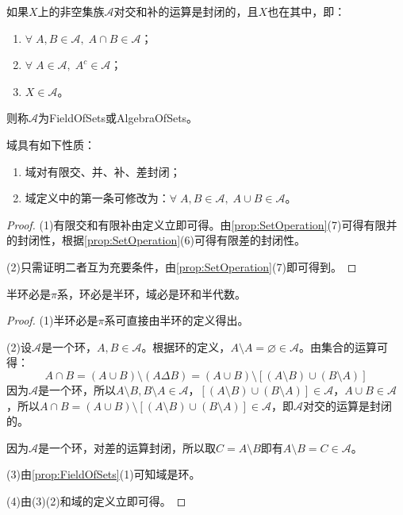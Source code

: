 \begin{definition}
	如果$X$上的非空集族$\mathscr{A}$对交和补的运算是封闭的，且$X$也在其中，即：
	\begin{enumerate}
		\item $\forall\;A,B\in\mathscr{A},\;A\cap B\in\mathscr{A}$；
		\item $\forall\;A\in\mathscr{A},\;A^c\in\mathscr{A}$；
		\item $X\in\mathscr{A}$。
	\end{enumerate}
	则称$\mathscr{A}$为\gls{FieldOfSets}或\gls{AlgebraOfSets}。
\end{definition}
\begin{property}\label{prop:FieldOfSets}
	域具有如下性质：
	\begin{enumerate}
		\item 域对有限交、并、补、差封闭；
		\item 域定义中的第一条可修改为：$\forall\;A,B\in\mathscr{A},\;A\cup B\in\mathscr{A}$。
	\end{enumerate}
\end{property}
\begin{proof}
	(1)有限交和有限补由定义立即可得。由\cref{prop:SetOperation}(7)可得有限并的封闭性，根据\cref{prop:SetOperation}(6)可得有限差的封闭性。\par
	(2)只需证明二者互为充要条件，由\cref{prop:SetOperation}(7)即可得到。
\end{proof}
\begin{theorem}\label{theo:SetNecessarilySet1}
	半环必是$\pi$系，环必是半环，域必是环和半代数。
\end{theorem}
\begin{proof}
	(1)半环必是$\pi$系可直接由半环的定义得出。\par
	(2)设$\mathscr{A}$是一个环，$A,B\in\mathscr{A}$。根据环的定义，$A\setminus A=\varnothing\in\mathscr{A}$。由集合的运算可得：
	\begin{equation*}
		A\cap B=(A\cup B)\setminus(A\Delta B)=(A\cup B)\setminus[(A\setminus B)\cup(B\setminus A)] 
	\end{equation*}
	因为$\mathscr{A}$是一个环，所以$A\setminus B,B\setminus A\in\mathscr{A}$，$[(A\setminus B)\cup(B\setminus A)]\in\mathscr{A}$，$A\cup B\in\mathscr{A}$，所以$A\cap B=(A\cup B)\setminus[(A\setminus B)\cup(B\setminus A)]\in\mathscr{A}$，即$\mathscr{A}$对交的运算是封闭的。\par
	因为$\mathscr{A}$是一个环，对差的运算封闭，所以取$C=A\setminus B$即有$A\setminus B=C\in\mathscr{A}$。\par
	(3)由\cref{prop:FieldOfSets}(1)可知域是环。\par
	(4)由(3)(2)和域的定义立即可得。
\end{proof}
